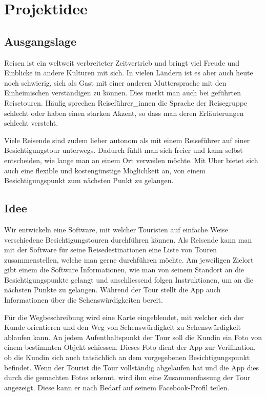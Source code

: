 \section{Projektidee}\label{Projektidee}
\subsection{Ausgangslage}\label{Ausgangslage}
Reisen ist ein weltweit verbreiteter Zeitvertrieb und bringt viel Freude und Einblicke in andere Kulturen mit sich. In vielen Ländern ist es aber auch heute noch schwierig, sich als Gast mit einer anderen Muttersprache mit den Einheimischen verständigen zu können. Dies merkt man auch bei geführten Reisetouren. Häufig sprechen Reiseführer\_innen die Sprache der Reisegruppe schlecht oder haben einen starken Akzent, so dass man deren Erläuterungen schlecht versteht.

Viele Reisende sind zudem lieber autonom als mit einem Reiseführer auf einer Besichtigungstour unterwegs. Dadurch fühlt man sich freier und kann selbst entscheiden, wie lange man an einem Ort verweilen möchte. Mit Uber bietet sich auch eine flexible und kostengünstige Möglichkeit an, von einem Besichtigungspunkt zum nächsten Punkt zu gelangen.

\subsection{Idee}\label{idee}
Wir entwickeln eine Software, mit welcher Touristen auf einfache Weise verschiedene Besichtigungstouren durchführen können.
Als Reisende kann man mit der Software für seine Reisedestinationen eine Liste von Touren zusammenstellen, welche man gerne durchführen möchte. Am jeweiligen Zielort gibt einem die Software Informationen, wie man von seinem Standort an die Besichtigungspunkte gelangt und anschliessend folgen Instruktionen, um an die nächsten Punkte zu gelangen. Während der Tour stellt die App auch Informationen über die Sehenswürdigkeiten bereit.

Für die Wegbeschreibung wird eine Karte eingeblendet, mit welcher sich der Kunde orientieren und den Weg von Sehenswürdigkeit zu Sehenswürdigkeit ablaufen kann. An jedem Aufenthaltspunkt der Tour soll die Kundin ein Foto von einem bestimmten Objekt schiessen. Dieses Foto dient der App zur Verifikation, ob die Kundin sich auch tatsächlich an dem vorgegebenen Besichtigungspunkt befindet. Wenn der Tourist die Tour vollständig abgelaufen hat und die App dies durch die gemachten Fotos erkennt, wird ihm eine Zusammenfassung der Tour angezeigt. Diese kann er nach Bedarf auf seinem Facebook-Profil teilen.

